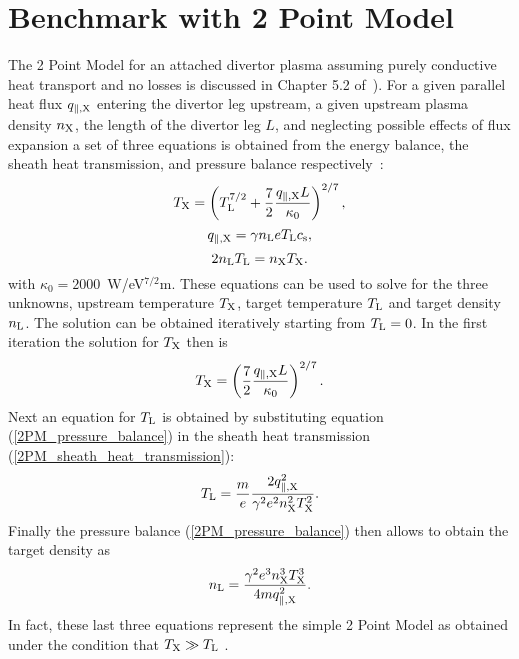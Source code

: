 \documentclass[amsmath,amssymb,a4]{revtex4-2}
\begin{document}
\cleardoublepage
\section{Benchmark with 2 Point Model}
The 2 Point Model for an attached divertor plasma assuming purely conductive heat transport and no losses is discussed in Chapter 5.2 of~\cite{stangeby}). For a given parallel heat flux $q_{\parallel,\rm X}$ entering the divertor leg upstream, a given upstream plasma density $n_{\rm X}$, the length of the divertor leg $L$, and neglecting possible effects of flux expansion a set of three equations is obtained from the energy balance, the sheath heat transmission, and pressure balance respectively~\cite{stangeby}:
\begin{equation}\label{2PM_energy_balance}
    T_{\rm X} = \left(T_{\rm L}^{7/2} + {7 \over 2} {q_{\parallel,\rm X} L \over \kappa_0}\right)^{2/7},
\end{equation}
\begin{equation}\label{2PM_sheath_heat_transmission}
    q_{\parallel,\rm X} = \gamma n_{\rm L} e T_{\rm L} c_{\rm s},
\end{equation}
\begin{equation}\label{2PM_pressure_balance}
    2 n_{\rm L} T_{\rm L} = n_{\rm X} T_{\rm X}.
\end{equation}
with $\kappa_0 = 2000$~W/eV$^{7/2}$m. These equations can be used to solve for the three unknowns, upstream temperature $T_{\rm X}$, target temperature $T_{\rm L}$ and target density $n_{\rm L}$. The solution can be obtained iteratively starting from $T_{\rm L} = 0$. In the first iteration the solution for $T_{\rm X}$ then is
\begin{equation}\label{2PM_upstream_temperature}
    T_{\rm X} = \left({7 \over 2} {q_{\parallel,\rm X} L \over \kappa_0}\right)^{2/7}.
\end{equation}
Next an equation for $T_{\rm L}$ is obtained by substituting equation (\ref{2PM_pressure_balance}) in the sheath heat transmission (\ref{2PM_sheath_heat_transmission}):
\begin{equation}\label{2PM_target_temperature}
    T_{\rm L} = {m \over e} {2 q_{\parallel,\rm X}^2 \over \gamma^2 e^2 n_{\rm X}^2 T_{\rm X}^2}.
\end{equation}
Finally the pressure balance (\ref{2PM_pressure_balance}) then allows to obtain the target density as
\begin{equation}\label{2PM_target_density}
    n_{\rm L} = {\gamma^2 e^3 n_{\rm X}^3 T_{\rm X}^3 \over 4 m q_{\parallel,\rm X}^2}.
\end{equation}
In fact, these last three equations represent the simple 2 Point Model as obtained under the condition that $T_{\rm X} \gg T_{\rm L}$ \cite{stangeby}.
\end{document}
